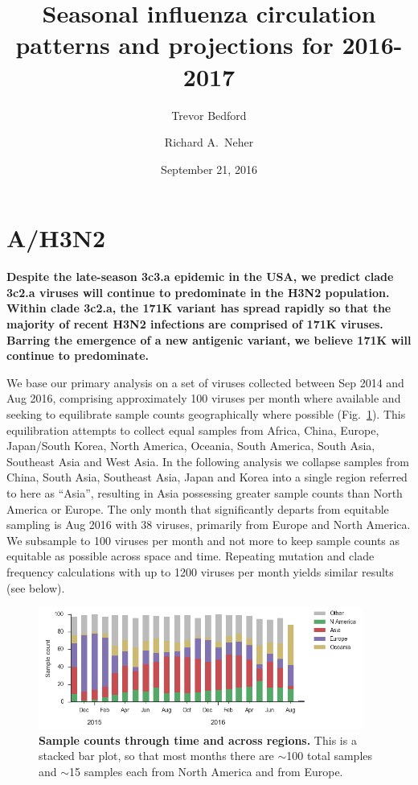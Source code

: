 \documentclass[11pt,oneside,letterpaper]{article}
\title{\vspace{2cm} \LARGE \bf
Seasonal influenza circulation patterns and projections for 2016-2017
}
\author[1]{Trevor Bedford}
\author[2]{Richard A.\ Neher}
\affil[1]{Vaccine and Infectious Disease Division, Fred Hutchinson Cancer Research Center, Seattle, WA, USA}
\affil[2]{Max Planck Institute for Developmental Biology, T\"ubingen, Germany}
\date{September 21, 2016}
\begin{document}
\maketitle

\tableofcontents

\pagebreak

\section*{A/H3N2}

\textbf{Despite the late-season 3c3.a epidemic in the USA, we predict clade 3c2.a viruses will continue to predominate in the H3N2 population. Within clade 3c2.a, the 171K variant has spread rapidly so that the majority of recent H3N2 infections are comprised of 171K viruses. Barring the emergence of a new antigenic variant, we believe 171K will continue to predominate.}

We base our primary analysis on a set of viruses collected between Sep 2014 and Aug 2016, comprising approximately 100 viruses per month where available and seeking to equilibrate sample counts geographically where possible (Fig.\ \ref{H3N2_counts}). This equilibration attempts to collect equal samples from Africa, China, Europe, Japan/South Korea, North America, Oceania, South America, South Asia, Southeast Asia and West Asia. In the following analysis we collapse samples from China, South Asia, Southeast Asia, Japan and Korea into a single region referred to here as ``Asia'', resulting in Asia possessing greater sample counts than North America or Europe. The only month that significantly departs from equitable sampling is Aug 2016 with 38 viruses, primarily from Europe and North America. We subsample to 100 viruses per month and not more to keep sample counts as equitable as possible across space and time. Repeating mutation and clade frequency calculations with up to 1200 viruses per month yields similar results (see below).

\begin{figure}[H]
	\centering
	\includegraphics[width=0.95\textwidth]{../figures/sep-2016/H3N2_counts.png}
	\caption{\textbf{Sample counts through time and across regions.}
	This is a stacked bar plot, so that most months there are $\sim$100 total samples and $\sim$15 samples each from North America and from Europe.
	}
	\label{H3N2_counts}
\end{figure}
\end{document}
